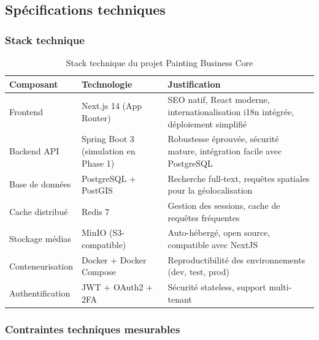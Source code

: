 \documentclass[12pt,a4paper]{report}
\begin{document}
\subsection{Spécifications techniques}

\subsubsection*{Stack technique}

\begin{table}[H]
\centering
\caption{Stack technique du projet Painting Business Core}
\label{tab:stack_tech}
\small
\begin{tabular}{|p{}|p{}|p{}|}
\hline
\textbf{Composant} & \textbf{Technologie} & \textbf{Justification} \\
\hline
Frontend & Next.js 14 (App Router) & SEO natif, React moderne, internationalisation i18n intégrée, déploiement simplifié \\
\hline
Backend API & Spring Boot 3 (simulation en Phase 1) & Robustesse éprouvée, sécurité mature, intégration facile avec PostgreSQL \\
\hline
Base de données & PostgreSQL + PostGIS & Recherche full-text, requêtes spatiales pour la géolocalisation \\
\hline
Cache distribué & Redis 7 & Gestion des sessions, cache de requêtes fréquentes \\
\hline
Stockage médias & MinIO (S3-compatible) & Auto-hébergé, open source, compatible avec NextJS \\
\hline
Conteneurisation & Docker + Docker Compose & Reproductibilité des environnements (dev, test, prod) \\
\hline
Authentification & JWT + OAuth2 + 2FA & Sécurité stateless, support multi-tenant \\
\hline
\end{tabular}
\end{table}

\subsubsection*{Contraintes techniques mesurables}
\end{document}
